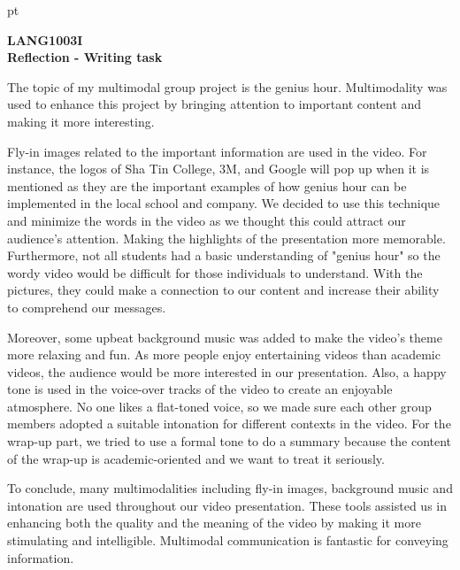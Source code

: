 \documentclass[12pt]{article}
\begin{document}
 pt
\begin{center}
{\bf \Large LANG1003I\\ Reflection - Writing task}
\end{center}
\vspace{0.3cm}


The topic of my multimodal group project is the genius hour. Multimodality was used to enhance this project by bringing attention to important content and making it more interesting.



Fly-in images related to the important information are used in the video. For instance, the logos of Sha Tin College, 3M, and Google will pop up when it is mentioned as they are the important examples of how genius hour can be implemented in the local school and company. We decided to use this technique and minimize the words in the video as we thought this could attract our audience’s attention. Making the highlights of the presentation more memorable. Furthermore, not all students had a basic understanding of "genius hour" so the wordy video would be difficult for those individuals to understand. With the pictures, they could make a connection to our content and increase their ability to comprehend our messages.



Moreover, some upbeat background music was added to make the video's theme more relaxing and fun. As more people enjoy entertaining videos than academic videos, the audience would be more interested in our presentation. Also, a happy tone is used in the voice-over tracks of the video to create an enjoyable atmosphere. No one likes a flat-toned voice, so we made sure each other group members adopted a suitable intonation for different contexts in the video. For the wrap-up part, we tried to use a formal tone to do a summary because the content of the wrap-up is academic-oriented and we want to treat it seriously.



To conclude, many multimodalities including fly-in images, background music and intonation are used throughout our video presentation. These tools assisted us in enhancing both the quality and the meaning of the video by making it more stimulating and intelligible. Multimodal communication is fantastic for conveying information.
\end{document}
